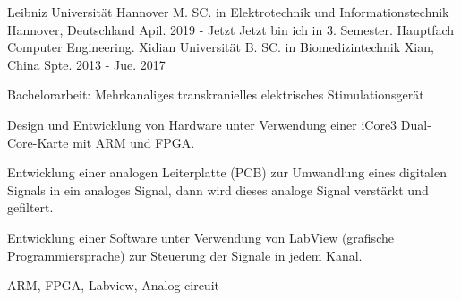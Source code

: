 

\begin{cventries}

	\cventry
	{Leibniz Universität Hannover} %
	{M. SC. in Elektrotechnik und Informationstechnik} %
	{Hannover, Deutschland} %
	{Apil. 2019 - Jetzt} %
	{Jetzt bin ich in 3. Semester. Hauptfach Computer Engineering.}
	{}
  \cventry
  	{Xidian Universität} %
    {B. SC. in Biomedizintechnik} %
    {Xian, China} %
    {Spte. 2013 - Jue. 2017} %
    {
      \begin{cvitems} %
      	\item {	Bachelorarbeit: Mehrkanaliges transkranielles elektrisches Stimulationsgerät}
        \item {Design und Entwicklung von Hardware unter Verwendung einer iCore3 Dual-Core-Karte mit ARM und FPGA.}
        \item { Entwicklung einer analogen Leiterplatte (PCB) zur Umwandlung eines digitalen Signals in ein analoges Signal, dann wird dieses analoge Signal verstärkt und gefiltert.}
        \item {Entwicklung einer Software unter Verwendung von LabView (grafische Programmiersprache) zur Steuerung der Signale in jedem Kanal.}
      \end{cvitems}
    }
	{ARM, FPGA, Labview, Analog circuit}


\end{cventries}

